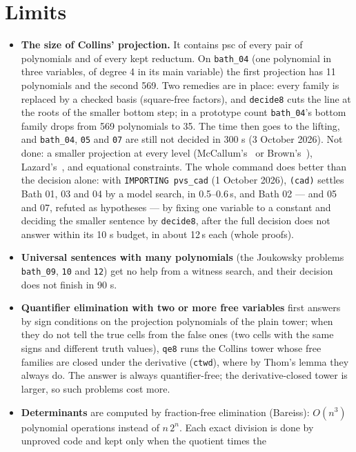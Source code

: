 \documentclass[11pt]{article}
\begin{document}
\section{Limits}
\begin{itemize}[leftmargin=1.3em, itemsep=3pt]
\item \textbf{The size of Collins' projection.} It contains psc of every pair of polynomials and of every kept
reductum. On \texttt{bath\_04} (one polynomial in three variables, of degree 4 in its main variable) the first
projection has 11 polynomials and the second 569. Two remedies are in place: every family is replaced by a checked
basis (square-free factors), and \texttt{decide8} cuts the line at the roots of the smaller bottom step; in a
prototype count \texttt{bath\_04}'s bottom family drops from 569 polynomials to 35. The time then goes to the lifting,
and \texttt{bath\_04}, \texttt{05} and \texttt{07} are still not decided in 300 s (3 October 2026). Not done: a
smaller projection at every level (McCallum's~\cite{mccallum} or Brown's~\cite{brown}), Lazard's~\cite{lazard,mpp},
and equational constraints. The whole command does better than the decision alone: with \texttt{IMPORTING
pvs\_cad} (1 October 2026), \texttt{(cad)} settles Bath 01, 03 and 04 by a model search, in 0.5--0.6\,s, and
Bath 02 --- and 05 and 07, refuted as hypotheses --- by fixing one variable to a constant and deciding the smaller
sentence by \texttt{decide8}, after the full decision does not answer within its 10 s budget, in about 12\,s each
(whole proofs).
\item \textbf{Universal sentences with many polynomials} (the Joukowsky problems \texttt{bath\_09}, \texttt{10}
and \texttt{12}) get no help from a witness search, and their decision does not finish in 90 s.
\item \textbf{Quantifier elimination with two or more free variables} first answers by sign conditions on the
projection polynomials of the plain tower; when they do not tell the true cells from the false ones (two cells
with the same signs and different truth values), \texttt{qe8} runs the Collins tower whose free families are
closed under the derivative (\texttt{ctwd}), where by Thom's lemma they always do. The answer is always
quantifier-free; the derivative-closed tower is larger, so such problems cost more.
\item \textbf{Determinants} are computed by fraction-free elimination (Bareiss): $O(n^3)$ polynomial operations
instead of $n\,2^n$. Each exact division is done by unproved code and kept only when the quotient times the

\end{itemize}
\end{document}
